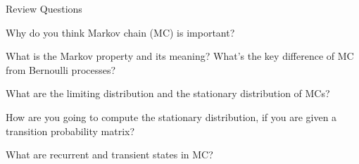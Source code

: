 \begin{frame}{Review Questions}

\bce[1)]
\item Why do you think Markov chain (MC) is important?

\item What is the Markov property and its meaning? What's the key difference of MC from Bernoulli processes?

\item What are the limiting distribution and the stationary distribution of MCs?

\item How are you going to  compute the stationary distribution, if you are given a transition probability matrix?

\item What are recurrent and transient states in MC?


\ece

\end{frame}





  






